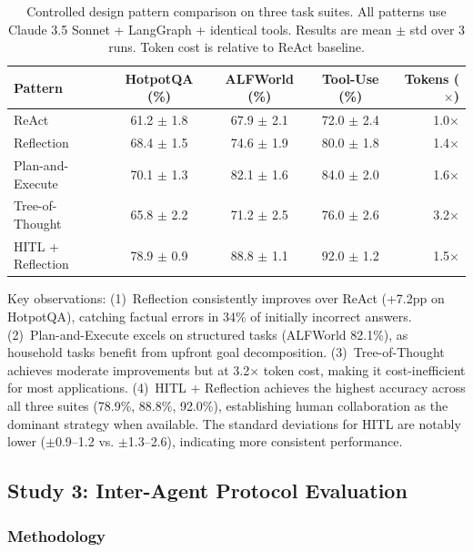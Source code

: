 \documentclass[review,authoryear]{elsarticle}
\theoremstyle{definition}
\begin{document}
\begin{table}[ht]
\centering
\caption{Controlled design pattern comparison on three task suites. All patterns use Claude 3.5 Sonnet + LangGraph + identical tools. Results are mean $\pm$ std over 3 runs. Token cost is relative to ReAct baseline.}
\label{tab:patterns}
\begin{tabular}{lcccr}
\toprule
\textbf{Pattern} & \textbf{HotpotQA (\%)} & \textbf{ALFWorld (\%)} & \textbf{Tool-Use (\%)} & \textbf{Tokens ($\times$)} \\
\midrule
ReAct              & 61.2 $\pm$ 1.8  & 67.9 $\pm$ 2.1  & 72.0 $\pm$ 2.4 & 1.0$\times$ \\
Reflection         & 68.4 $\pm$ 1.5  & 74.6 $\pm$ 1.9  & 80.0 $\pm$ 1.8 & 1.4$\times$ \\
Plan-and-Execute   & 70.1 $\pm$ 1.3  & 82.1 $\pm$ 1.6  & 84.0 $\pm$ 2.0 & 1.6$\times$ \\
Tree-of-Thought    & 65.8 $\pm$ 2.2  & 71.2 $\pm$ 2.5  & 76.0 $\pm$ 2.6 & 3.2$\times$ \\
HITL + Reflection  & 78.9 $\pm$ 0.9  & 88.8 $\pm$ 1.1  & 92.0 $\pm$ 1.2 & 1.5$\times$ \\
\bottomrule
\end{tabular}
\end{table}

Key observations: (1)~Reflection consistently improves over ReAct (+7.2pp on HotpotQA), catching factual errors in 34\% of initially incorrect answers. (2)~Plan-and-Execute excels on structured tasks (ALFWorld 82.1\%), as household tasks benefit from upfront goal decomposition. (3)~Tree-of-Thought achieves moderate improvements but at 3.2$\times$ token cost, making it cost-inefficient for most applications. (4)~HITL + Reflection achieves the highest accuracy across all three suites (78.9\%, 88.8\%, 92.0\%), establishing human collaboration as the dominant strategy when available. The standard deviations for HITL are notably lower ($\pm$0.9--1.2 vs. $\pm$1.3--2.6), indicating more consistent performance.

\subsection{Study 3: Inter-Agent Protocol Evaluation}\label{sec:protocol-eval}

\subsubsection{Methodology}
\end{document}
